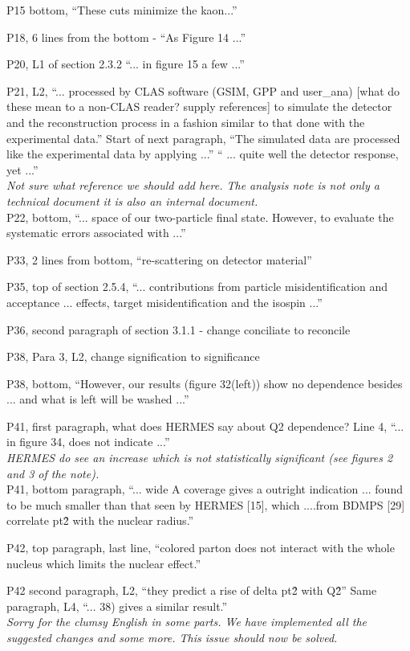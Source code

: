 \documentclass[12pt]{article}
\begin{document}
P15 bottom, “These cuts minimize the kaon...”

P18, 6 lines from the bottom - “As Figure 14 ...”

P20, L1 of section 2.3.2 “... in figure 15 a few ...”

P21, L2, “... processed by CLAS software (GSIM, GPP and user\_ana) [what do these mean to a 
non-CLAS reader? supply references] to simulate the detector and the reconstruction process in 
a fashion similar to that done with the experimental data.”
Start of next paragraph, “The simulated data are processed like the experimental data by 
applying ...”  “ ... quite well the detector response, yet ...” \\

{\it Not sure what reference we should add here. The analysis note is not only a technical document
it is also an internal document.} \\

P22, bottom, “... space of our two-particle final state.  However, to evaluate the systematic 
errors associated with ...”

P33, 2 lines from bottom, “re-scattering on detector material”

P35, top of section 2.5.4, “... contributions from particle misidentification and acceptance ... 
effects, target misidentification and the isospin ...”

P36, second paragraph of section 3.1.1 -
 change conciliate to reconcile

P38, Para 3, L2, change signification to significance

P38, bottom, “However, our results (figure 32(left)) show no dependence besides ... and what is 
left will be washed ...”

P41, first paragraph, what does HERMES say about Q2 dependence?  Line 4, “... in figure 34, 
does not indicate ...” \\

{\it HERMES do see an increase which is not statistically significant 
(see figures 2 and 3 of the note).} \\

P41, bottom paragraph, “... wide A coverage gives a outright indication ... found to be much 
smaller than that seen by HERMES [15], which ....from BDMPS [29] correlate pt\^2 with the 
nuclear radius.”

P42, top paragraph, last line, “colored parton does not interact with the whole nucleus which 
limits the nuclear effect.”

P42 second paragraph, L2, “they predict a rise of delta pt\^2 with Q\^2”
Same paragraph, L4, “... 38) gives a similar result.” \\

{\it Sorry for the clumsy English in some parts. We have implemented all the 
suggested changes and some more. This issue should now be solved.} \\
\end{document}
